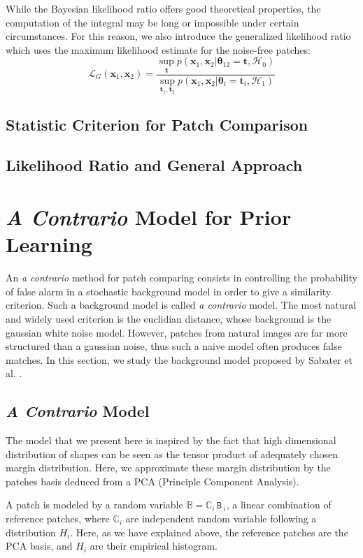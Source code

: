\documentclass[runningheads]{llncs}
\newcommand{\mat}[1]{\ensuremath{\,\mathtt{#1}\,}}
\newcommand{\rand}[1]{\ensuremath{\mathbb{#1}}}
\begin{document}
While the Bayesian likelihood ratio offers good theoretical properties, the computation of the integral may be long or impossible under certain circumstances. For this reason, we also introduce the generalized likelihood ratio which uses the maximum likelihood estimate for the noise-free patches:
\[
\mathcal{L}_G(\mathbf{x}_1,\mathbf{x}_2)=\frac{\sup_{\mathbf{t}}p(\mathbf{x}_1,\mathbf{x}_2|\boldsymbol\theta_{12}=\mathbf{t}, \mathcal{H}_0)}{\sup_{\mathbf{t}_1,\mathbf{t}_2}p(\mathbf{x}_1,\mathbf{x}_2|\boldsymbol\theta_i=\mathbf{t}_i, \mathcal{H}_1)}
\]
\subsection{Statistic Criterion for Patch Comparison}
\subsection{Likelihood Ratio and General Approach}

\section{\textit{A Contrario} Model for Prior Learning}

An \textit{a contrario} method for patch comparing consists in controlling the probability of false alarm in a stochastic background model in order to give a similarity criterion. Such a background model is called \textit{a contrario} model. The most natural and widely used criterion is the euclidian distance, whose background is the gaussian white noise model. However, patches from natural images are far more structured than a gaussian noise, thus such a naive model often produces false matches. In this section, we study the background model proposed by Sabater et al. \cite{Sabater:2012}.
\subsection{\textit{A Contrario} Model}

The model that we present here is inspired by the fact that high dimensional distribution of shapes can be seen as the tensor product of adequately chosen margin distribution. Here, we approximate these margin distribution by the patches basis deduced from a PCA (Principle Component Analysis). 

A patch is modeled by a random variable $\rand{B}=\rand{C}_i \mat{B}_i$, a linear combination of reference patches, where $\rand{C}_i$ are independent random variable following a distribution $H_i$. Here, as we have explained above, the reference patches are the PCA basis, and $ H_i$ are their empirical histogram.
\end{document}
